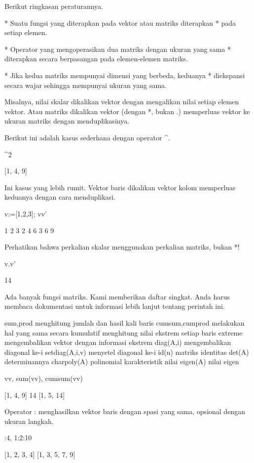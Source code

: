 \documentclass{article}
\begin{document}
Berikut ringkasan peraturannya.


* 
Suatu fungsi yang diterapkan pada vektor atau matriks diterapkan
* pada setiap elemen.


* 
Operator yang mengoperasikan dua matriks dengan ukuran yang sama
* diterapkan secara berpasangan pada elemen-elemen matriks.


* 
Jika kedua matriks mempunyai dimensi yang berbeda, keduanya
* diekspansi secara wajar sehingga mempunyai ukuran yang sama.


Misalnya, nilai skalar dikalikan vektor dengan mengalikan nilai setiap
elemen vektor. Atau matriks dikalikan vektor (dengan *, bukan .)
memperluas vektor ke ukuran matriks dengan menduplikasinya.


Berikut ini adalah kasus sederhana dengan operator ^.


\>[1,2,3]^2


    [1,  4,  9]

Ini kasus yang lebih rumit. Vektor baris dikalikan vektor kolom
memperluas keduanya dengan cara menduplikasi.


\>v:=[1,2,3]; v\*v'


                1             2             3 
                2             4             6 
                3             6             9 

Perhatikan bahwa perkalian skalar menggunakan perkalian matriks, bukan
*!


\>v.v'


    14

Ada banyak fungsi matriks. Kami memberikan daftar singkat. Anda harus
membaca dokumentasi untuk informasi lebih lanjut tentang perintah ini.


  sum,prod menghitung jumlah dan hasil kali baris  
  cumsum,cumprod melakukan hal yang sama secara kumulatif  
  menghitung nilai ekstrem setiap baris  
  extreme mengembalikan vektor dengan informasi ekstrem  
  diag(A,i) mengembalikan diagonal ke-i  
  setdiag(A,i,v) menyetel diagonal ke-i  
  id(n) matriks identitas  
  det(A) determinannya  
  charpoly(A) polinomial karakteristik  
  nilai eigen(A) nilai eigen  

\>v\*v, sum(v\*v), cumsum(v\*v)


    [1,  4,  9]
    14
    [1,  5,  14]

Operator : menghasilkan vektor baris dengan spasi yang sama, opsional
dengan ukuran langkah.


:4, 1:2:10


    [1,  2,  3,  4]
    [1,  3,  5,  7,  9]
\end{document}
